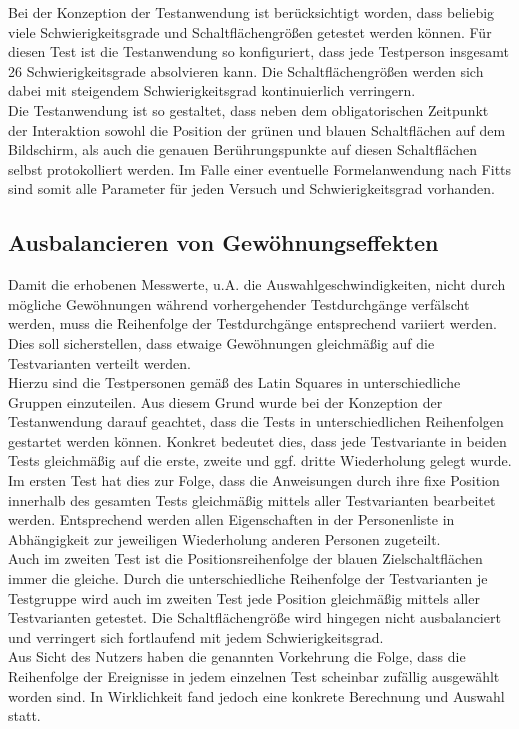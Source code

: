 \documentclass[12pt,numbers=noenddot,parskip,bibliography=totocnumbered,listof=totocnumbered]{scrreprt}
\begin{document}
Bei der Konzeption der Testanwendung ist berücksichtigt worden, dass beliebig viele Schwierigkeitsgrade und Schaltflächengrößen getestet werden können. Für diesen Test ist die Testanwendung so konfiguriert, dass jede Testperson insgesamt 26 Schwierigkeitsgrade absolvieren kann. Die Schaltflächengrößen werden sich dabei mit steigendem Schwierigkeitsgrad kontinuierlich verringern.\\
Die Testanwendung ist so gestaltet, dass neben dem obligatorischen Zeitpunkt der Interaktion sowohl die Position der grünen und blauen Schaltflächen auf dem Bildschirm, als auch die genauen Berührungspunkte auf diesen Schaltflächen selbst protokolliert werden. Im Falle einer eventuelle Formelanwendung nach Fitts \citep{fitts} sind somit alle Parameter für jeden Versuch und Schwierigkeitsgrad vorhanden.

\subsection{Ausbalancieren von Gewöhnungseffekten}
Damit die erhobenen Messwerte, u.A. die Auswahlgeschwindigkeiten, nicht durch mögliche Gewöhnungen während vorhergehender Testdurchgänge verfälscht werden, muss die Reihenfolge der Testdurchgänge entsprechend variiert werden. Dies soll sicherstellen, dass etwaige Gewöhnungen gleichmäßig auf die Testvarianten verteilt werden.\\
Hierzu sind die Testpersonen gemäß des Latin Squares in unterschiedliche Gruppen einzuteilen. Aus diesem Grund wurde bei der Konzeption der Testanwendung darauf geachtet, dass die Tests in unterschiedlichen Reihenfolgen gestartet werden können. Konkret bedeutet dies, dass jede Testvariante in beiden Tests gleichmäßig auf die erste, zweite und ggf. dritte Wiederholung gelegt wurde.\\
Im ersten Test hat dies zur Folge, dass die Anweisungen durch ihre fixe Position innerhalb des gesamten Tests gleichmäßig mittels aller Testvarianten bearbeitet werden. Entsprechend werden allen Eigenschaften in der Personenliste in Abhängigkeit zur jeweiligen Wiederholung anderen Personen zugeteilt.\\
Auch im zweiten Test ist die Positionsreihenfolge der blauen Zielschaltflächen immer die gleiche. Durch die unterschiedliche Reihenfolge der Testvarianten je Testgruppe wird auch im zweiten Test jede Position gleichmäßig mittels aller Testvarianten getestet. Die Schaltflächengröße wird hingegen nicht ausbalanciert und verringert sich fortlaufend mit jedem Schwierigkeitsgrad.\\
Aus Sicht des Nutzers haben die genannten Vorkehrung die Folge, dass die Reihenfolge der Ereignisse in jedem einzelnen Test scheinbar zufällig ausgewählt worden sind. In Wirklichkeit fand jedoch eine konkrete Berechnung und Auswahl statt.
\end{document}
